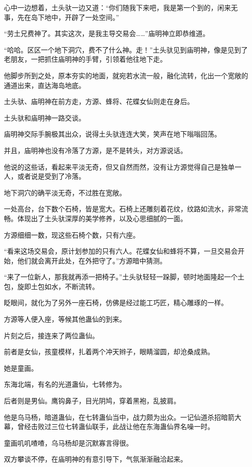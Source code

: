 \begin{this_body}
心中一边想着，土头驮一边又道：“你们随我下来吧，我是第一个到的，闲来无事，先在岛下地中，开辟了一处空间。”

“劳土兄费神了。其实这次，是我主导交易会……”庙明神立即恭维道。

“哈哈。区区一个地下洞穴，费不了什么神。走！”土头驮见到庙明神，像是见到了老朋友，一把抓住庙明神的手臂，引领着他往地下走。

他脚步所到之处，原本夯实的地面，就宛若水流一般，融化流转，化出一个宽敞的通道出来，直达海岛地底。

土头驮、庙明神在前方走，方源、蜂将、花蝶女仙则走在身后。

土头驮和庙明神一路交谈。

庙明神交际手腕极其出众，说得土头驮连连大笑，笑声在地下嗡嗡回荡。

并且，庙明神也没有冷落了方源，是不是转头，对方源说话。

他说的这些话，看起来平淡无奇，但又自然而然，没有让方源觉得自己是独单一人，或者说是受到了冷落。

地下洞穴的确平淡无奇，不过胜在宽敞。

一处高台，台下数个石椅，皆是宽大。石椅上还雕刻着花纹，纹路如流水，非常流畅。体现出了土头驮深厚的美学修养，以及心思细腻的一面。

方源细细一数，现这些石椅个数，只有六座。

“看来这场交易会，原计划参加的只有六人。花蝶女仙和蜂将不算，一旦交易会开始，他们就会离开此处，在外把守了。”方源暗中猜测。

“来了一位新人，那我就再添一把椅子。”土头驮轻轻一跺脚，顿时地面隆起一个土包，旋即土包如水，不断流转。

眨眼间，就化为了另外一座石椅，仿佛是经过能工巧匠，精心雕琢的一样。

方源等人便入座，等候其他蛊仙的到来。

片刻之后，接连来了两位蛊仙。

前者是女仙，孩童模样，扎着两个冲天辫子，眼睛溜圆，却沧桑成熟。

她是童画。

东海北端，有名的光道蛊仙，七转修为。

后者则是男仙。鹰钩鼻子，目光阴鸠，穿着黑袍，乱披肩。

他是乌马杨，暗道蛊仙，在七转蛊仙当中，战力颇为出众。一记仙道杀招暗箭大幕，曾经击败过三位七转蛊仙联手，此战让他在东海蛊仙界名噪一时。

童画叽叽喳喳，乌马杨却是沉默寡言得很。

双方攀谈不停，在庙明神的有意引导下，气氛渐渐融洽起来。


\end{this_body}
